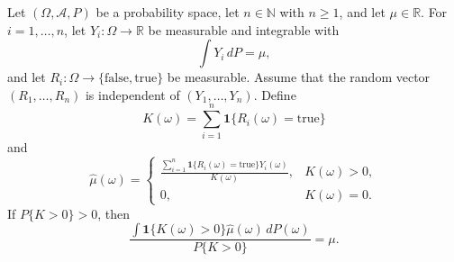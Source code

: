 \begin{theorem}
Let $(\Omega,\mathcal A,P)$ be a probability space, let
$n\in\mathbb N$ with $n\ge1$, and let $\mu\in\mathbb R$.  For
$i=1,\ldots,n$, let $Y_i:\Omega\to\mathbb R$ be measurable and integrable
with
\[
  \int Y_i\,dP=\mu,
\]
and let $R_i:\Omega\to\{\mathrm{false},\mathrm{true}\}$ be measurable.
Assume that the random vector $(R_1,\ldots,R_n)$ is independent of
$(Y_1,\ldots,Y_n)$.  Define
\[
 K(\omega)=\sum_{i=1}^n\mathbf 1\{R_i(\omega)=\mathrm{true}\}
\]
and
\[
 \widehat\mu(\omega)=
 \begin{cases}
 \displaystyle
 \frac{\sum_{i=1}^n\mathbf 1\{R_i(\omega)=\mathrm{true}\}Y_i(\omega)}
 {K(\omega)},&K(\omega)>0,\\[6pt]
 0,&K(\omega)=0.
 \end{cases}
\]
If $P\{K>0\}>0$, then
\[
  \frac{\int \mathbf 1\{K(\omega)>0\}\widehat\mu(\omega)\,dP(\omega)}
  {P\{K>0\}}=\mu.
\]
\end{theorem}
